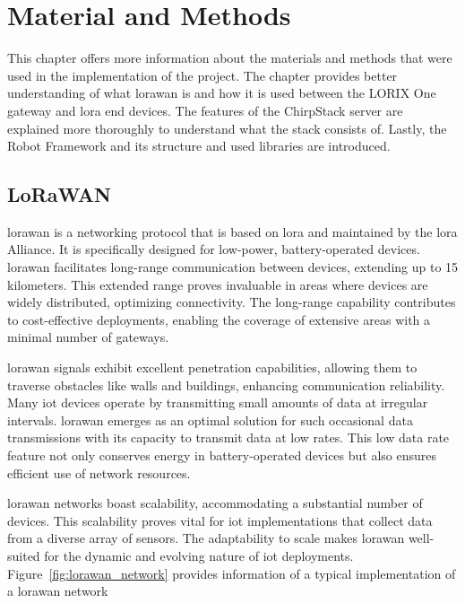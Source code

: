 
\chapter{Material and Methods} \label{ch:mat_met}

This chapter offers more information about the materials and methods that were used in the implementation of the project.
The chapter provides better understanding of what \gls{lorawan} is and how it is used between the LORIX One gateway and \gls{lora} end devices.
The features of the ChirpStack server are explained more thoroughly to understand what the stack consists of. 
Lastly, the Robot Framework and its structure and used libraries are introduced.

\section{LoRaWAN}
\gls{lorawan} is a networking protocol that is based on \gls{lora} and maintained by the \gls{lora} Alliance\cite{loraAlliance:aboutLorawan}.
It is specifically designed for low-power, battery-operated devices.
\gls{lorawan} facilitates long-range communication between devices, extending up to 15 kilometers.
This extended range proves invaluable in areas where devices are widely distributed, optimizing connectivity.
The long-range capability contributes to cost-effective deployments, enabling the coverage of extensive areas with a minimal number of gateways.

\gls{lorawan} signals exhibit excellent penetration capabilities, allowing them to traverse obstacles like walls and buildings, enhancing communication reliability.
Many \gls{iot} devices operate by transmitting small amounts of data at irregular intervals.
\gls{lorawan} emerges as an optimal solution for such occasional data transmissions with its capacity to transmit data at low rates.
This low data rate feature not only conserves energy in battery-operated devices but also ensures efficient use of network resources.

\gls{lorawan} networks boast scalability, accommodating a substantial number of devices.
This scalability proves vital for \gls{iot} implementations that collect data from a diverse array of sensors.
The adaptability to scale makes \gls{lorawan} well-suited for the dynamic and evolving nature of \gls{iot} deployments.
Figure~\ref{fig:lorawan_network} provides information of a typical implementation of a \gls{lorawan} network

